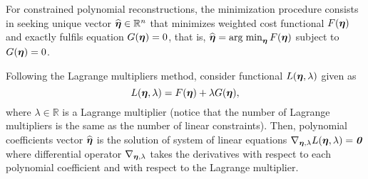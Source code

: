 For constrained polynomial reconstructions, the minimization procedure consists in seeking unique vector $\widehat{\boldsymbol{\eta}}\in\mathbb{R}^{n}$ that minimizes weighted cost functional $F\left(\bs{\eta}\right)$ and exactly fulfils equation $G\left(\bs{\eta}\right)=0$, that is, $\widehat{\bs{\eta}}=\argmin_{\bs{\eta}}F\left(\bs{\eta}\right)$ subject to $G\left(\bs{\eta}\right)=0$.

Following the Lagrange multipliers method, consider functional $L\left(\bs{\eta},\lambda\right)$ given as
\begin{equation}
\label{eq:appendix_least_squares_method_lagrange_multipliers_method_equation1}
L\left(\bs{\eta},\lambda\right)=F\left(\bs{\eta}\right)+\lambda G\left(\bs{\eta}\right),
\end{equation}
where $\lambda\in\mathbb{R}$ is a Lagrange multiplier (notice that the number of Lagrange multipliers is the same as the number of linear constraints).
Then, polynomial coefficients vector $\widehat{\boldsymbol{\eta}}$ is the solution of system of linear equations $\nabla_{\bs{\eta},\lambda} L\left(\bs{\eta},\lambda\right)=\bm{0}$ where differential operator $\nabla_{\boldsymbol{\eta},\lambda}$ takes the derivatives with respect to each polynomial coefficient and with respect to the Lagrange multiplier.


